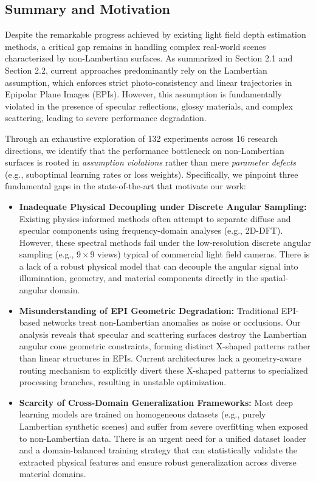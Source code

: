 \subsection{Summary and Motivation}

Despite the remarkable progress achieved by existing light field depth estimation methods, a critical gap remains in handling complex real-world scenes characterized by non-Lambertian surfaces. As summarized in Section 2.1 and Section 2.2, current approaches predominantly rely on the Lambertian assumption, which enforces strict photo-consistency and linear trajectories in Epipolar Plane Images (EPIs). However, this assumption is fundamentally violated in the presence of specular reflections, glossy materials, and complex scattering, leading to severe performance degradation. 

Through an exhaustive exploration of 132 experiments across 16 research directions, we identify that the performance bottleneck on non-Lambertian surfaces is rooted in \textit{assumption violations} rather than mere \textit{parameter defects} (e.g., suboptimal learning rates or loss weights). Specifically, we pinpoint three fundamental gaps in the state-of-the-art that motivate our work:

\begin{itemize}
    \item \textbf{Inadequate Physical Decoupling under Discrete Angular Sampling:} Existing physics-informed methods often attempt to separate diffuse and specular components using frequency-domain analyses (e.g., 2D-DFT). However, these spectral methods fail under the low-resolution discrete angular sampling (e.g., $9 \times 9$ views) typical of commercial light field cameras. There is a lack of a robust physical model that can decouple the angular signal into illumination, geometry, and material components directly in the spatial-angular domain.
    \item \textbf{Misunderstanding of EPI Geometric Degradation:} Traditional EPI-based networks treat non-Lambertian anomalies as noise or occlusions. Our analysis reveals that specular and scattering surfaces destroy the Lambertian angular cone geometric constraints, forming distinct X-shaped patterns rather than linear structures in EPIs. Current architectures lack a geometry-aware routing mechanism to explicitly divert these X-shaped patterns to specialized processing branches, resulting in unstable optimization.
    \item \textbf{Scarcity of Cross-Domain Generalization Frameworks:} Most deep learning models are trained on homogeneous datasets (e.g., purely Lambertian synthetic scenes) and suffer from severe overfitting when exposed to non-Lambertian data. There is an urgent need for a unified dataset loader and a domain-balanced training strategy that can statistically validate the extracted physical features and ensure robust generalization across diverse material domains.
\end{itemize}

